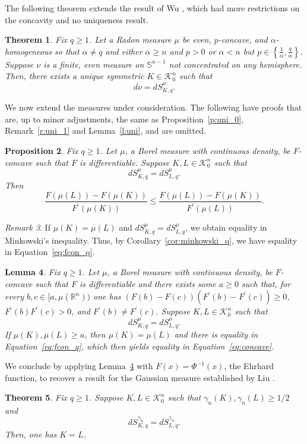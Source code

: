 \documentclass[11pt]{amsart}
\newtheorem{theorem}{Theorem}[section]
\newtheorem{lemma}[theorem]{Lemma}
\newtheorem{proposition}[theorem]{Proposition}
\theoremstyle{definition}
\theoremstyle{remark}
\newtheorem{remark}[theorem]{Remark}
\numberwithin{equation}{section}
\newcommand{\R}{\mathbb{R}}
\newcommand{\s}{\mathbb{S}}
\newcommand{\conbod}{\mathcal{K}^n}
\begin{document}
\noindent The following theorem extends the result of Wu \cite[Theorem 6.4]{DW17}, which had more restrictions on the concavity and no uniqueness result.

\begin{theorem}
\label{t:min_exist_uni_q}
Fix $q\geq 1$. Let a Radon measure $\mu$ be even, $p$-concave, and $\alpha$- homogeneous so that $\alpha \neq q$ and either $\alpha \geq n$ and $p>0$ or $\alpha<n$ but $p\in\left\{\frac{1}{\alpha},\frac{q}{\alpha}\right\}$. Suppose $\nu$ is a finite, even measure on $\s^{n-1}$ not concentrated on any hemisphere. Then, there exists a unique symmetric $K\in\conbod_0$ such that
$$d\nu=dS^{\mu}_{K,q}.$$
\end{theorem}

We now extend the measures under consideration. The following have proofs that are, up to minor adjustments, the same as Proposition~\ref{p:uni_0}, Remark~\ref{r:uni_1} and Lemma~\ref{l:uni}, and are omitted.
\begin{proposition}
\label{p:uni_0_1}
Fix $q\geq 1$. Let $\mu$, a Borel measure with continuous density, be $F$-concave such that $F$ is differentiable. Suppose $K,L\in\conbod_0$ such that $$dS^{\mu}_{K,q}=dS^{\mu}_{L,q}.$$ Then
$$\frac{F(\mu(L))-F(\mu(K))}{F^{\prime}(\mu(K))}\leq \frac{F(\mu(L))-F(\mu(K))}{F^{\prime}(\mu(L))}.$$
\end{proposition}
\begin{remark}
\label{r:uni_1_q}
If $\mu(K)=\mu(L)$ and $dS^{\mu}_{K,q}=dS^{\mu}_{L,q}$, we obtain equality in Minkowski's inequality. Thus, by Corollary~\ref{cor:minkowski_q}, we have equality in Equation~\ref{eq:fcon_q}.
\end{remark}

\begin{lemma}
\label{l:uni_q}
Fix $q\geq 1$. Let $\mu$, a Borel measure with continuous density, be $F$-concave such that $F$ is differentiable and there exists some $a\geq 0$ such that, for every $b,c\in [a,\mu(\R^n))$ one has $(F(b)-F(c))(F^\prime(b)-F^\prime(c))\geq 0$, $F^\prime(b)F^\prime(c)>0$, and $F^\prime(b)\neq F^\prime(c)$. Suppose $K,L\in\conbod_0$ such that $$dS^{\mu}_{K,q}=dS^{\mu}_{L,q}.$$ If $\mu(K),\mu(L)\geq a$, then $\mu(K)=\mu(L)$ and there is equality in Equation~\ref{eq:fcon_q}, which then yields equality in Equation~\ref{eq:concave}.
\end{lemma}

We conclude by applying Lemma~\ref{l:uni_q} with $F(x)=\Phi^{-1}(x)$, the Ehrhard function, to recover a result for the Gaussian measure established by Liu \cite{JL22}.
\begin{theorem}
\label{t:ehr_q}
Fix $q\geq 1$. Suppose $K,L\in\conbod_0$ such that $\gamma_n(K),\gamma_n(L)\geq 1/2$ and $$dS^{\gamma_n}_{K,q}=dS^{\gamma_n}_{L,q}.$$ Then, one has $K=L$.
\end{theorem}



\end{document}
